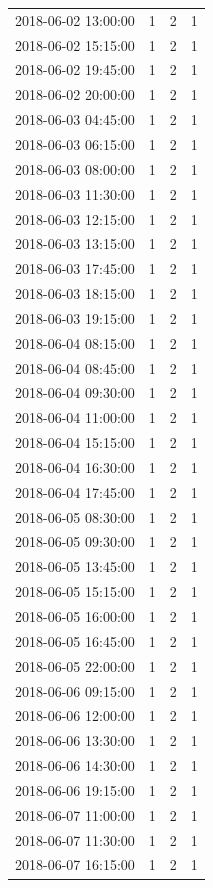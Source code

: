 \begin{tabular}{lrrr}
2018-06-02 13:00:00 & 1 & 2 & 1 \\
2018-06-02 15:15:00 & 1 & 2 & 1 \\
2018-06-02 19:45:00 & 1 & 2 & 1 \\
2018-06-02 20:00:00 & 1 & 2 & 1 \\
2018-06-03 04:45:00 & 1 & 2 & 1 \\
2018-06-03 06:15:00 & 1 & 2 & 1 \\
2018-06-03 08:00:00 & 1 & 2 & 1 \\
2018-06-03 11:30:00 & 1 & 2 & 1 \\
2018-06-03 12:15:00 & 1 & 2 & 1 \\
2018-06-03 13:15:00 & 1 & 2 & 1 \\
2018-06-03 17:45:00 & 1 & 2 & 1 \\
2018-06-03 18:15:00 & 1 & 2 & 1 \\
2018-06-03 19:15:00 & 1 & 2 & 1 \\
2018-06-04 08:15:00 & 1 & 2 & 1 \\
2018-06-04 08:45:00 & 1 & 2 & 1 \\
2018-06-04 09:30:00 & 1 & 2 & 1 \\
2018-06-04 11:00:00 & 1 & 2 & 1 \\
2018-06-04 15:15:00 & 1 & 2 & 1 \\
2018-06-04 16:30:00 & 1 & 2 & 1 \\
2018-06-04 17:45:00 & 1 & 2 & 1 \\
2018-06-05 08:30:00 & 1 & 2 & 1 \\
2018-06-05 09:30:00 & 1 & 2 & 1 \\
2018-06-05 13:45:00 & 1 & 2 & 1 \\
2018-06-05 15:15:00 & 1 & 2 & 1 \\
2018-06-05 16:00:00 & 1 & 2 & 1 \\
2018-06-05 16:45:00 & 1 & 2 & 1 \\
2018-06-05 22:00:00 & 1 & 2 & 1 \\
2018-06-06 09:15:00 & 1 & 2 & 1 \\
2018-06-06 12:00:00 & 1 & 2 & 1 \\
2018-06-06 13:30:00 & 1 & 2 & 1 \\
2018-06-06 14:30:00 & 1 & 2 & 1 \\
2018-06-06 19:15:00 & 1 & 2 & 1 \\
2018-06-07 11:00:00 & 1 & 2 & 1 \\
2018-06-07 11:30:00 & 1 & 2 & 1 \\
2018-06-07 16:15:00 & 1 & 2 & 1 \\

\end{tabular}
